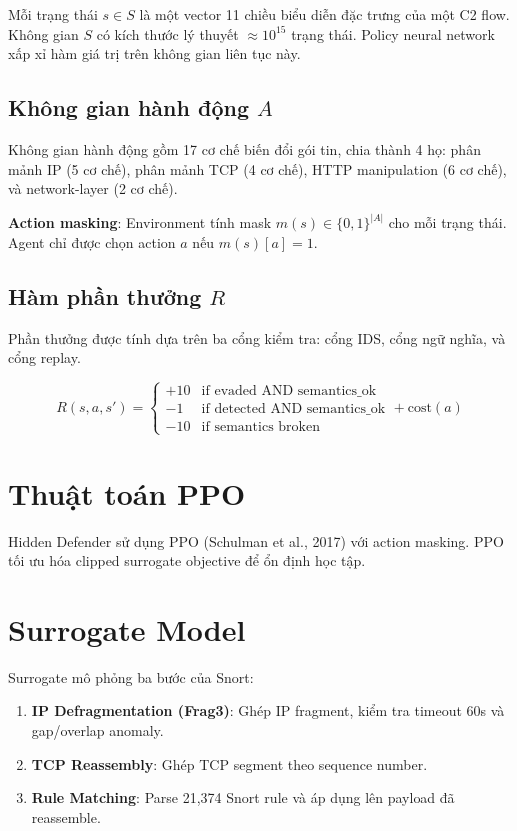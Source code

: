 \documentclass[12pt, a4paper, openany]{book}
\begin{document}
Mỗi trạng thái $s \in S$ là một vector 11 chiều biểu diễn đặc trưng của một C2 flow. Không gian $S$ có kích thước lý thuyết $\approx 10^{15}$ trạng thái. Policy neural network xấp xỉ hàm giá trị trên không gian liên tục này.

\subsection{Không gian hành động $A$}

Không gian hành động gồm 17 cơ chế biến đổi gói tin, chia thành 4 họ: phân mảnh IP (5 cơ chế), phân mảnh TCP (4 cơ chế), HTTP manipulation (6 cơ chế), và network-layer (2 cơ chế).

\textbf{Action masking}: Environment tính mask $m(s) \in \{0,1\}^{|A|}$ cho mỗi trạng thái. Agent chỉ được chọn action $a$ nếu $m(s)[a] = 1$.

\subsection{Hàm phần thưởng $R$}

Phần thưởng được tính dựa trên ba cổng kiểm tra: cổng IDS, cổng ngữ nghĩa, và cổng replay.

\begin{equation}
R(s, a, s') = \begin{cases}
+10 & \text{if evaded AND semantics\_ok} \\
-1 & \text{if detected AND semantics\_ok} \\
-10 & \text{if semantics broken}
\end{cases} + \text{cost}(a)
\end{equation}

\section{Thuật toán PPO}

Hidden Defender sử dụng PPO (Schulman et al., 2017) với action masking. PPO tối ưu hóa clipped surrogate objective để ổn định học tập.

\section{Surrogate Model}

Surrogate mô phỏng ba bước của Snort:

\begin{enumerate}
    \item \textbf{IP Defragmentation (Frag3)}: Ghép IP fragment, kiểm tra timeout 60s và gap/overlap anomaly.
    \item \textbf{TCP Reassembly}: Ghép TCP segment theo sequence number.
    \item \textbf{Rule Matching}: Parse 21,374 Snort rule và áp dụng lên payload đã reassemble.
\end{enumerate}
\end{document}
